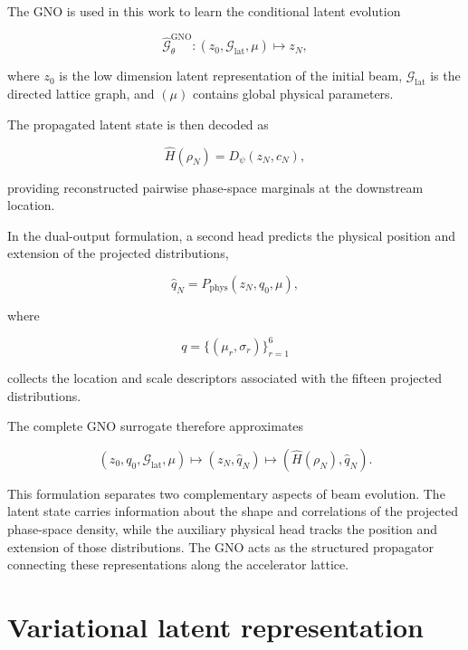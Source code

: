 The GNO is used in this work to learn the conditional latent evolution

\begin{equation}
\label{eq:133}
\widehat{\mathcal G}_{\theta}^{\mathrm{GNO}}:(z_0,\mathcal G_{\mathrm{lat}},\mu)\longmapsto z_N,
\end{equation}

where \(z_{0}\) is the low dimension latent representation of the initial beam, \(\mathcal{G}_{\mathrm{lat}}\) is the directed lattice graph, and \(( \mu )\) contains global physical parameters.

The propagated latent state is then decoded as

\begin{equation}
\label{eq:134}
\widehat H(\rho_N)=D_{\psi}(z_N,c_N),
\end{equation}

providing reconstructed pairwise phase-space marginals at the downstream location.

In the dual-output formulation, a second head predicts the physical position and extension of the projected distributions,

\begin{equation}
\label{eq:135}
\widehat q_N=P_{\mathrm{phys}}(z_N,q_0,\mu),
\end{equation}

where

\begin{equation}
\label{eq:136}
q=\{(\mu_r,\sigma_r)\}_{r=1}^{6}
\end{equation}

collects the location and scale descriptors associated with the fifteen projected distributions.

The complete GNO surrogate therefore approximates

\begin{equation}
\label{eq:137}
(z_0,q_0,\mathcal G_{\mathrm{lat}},\mu)\longmapsto(z_N,\widehat q_N)\longmapsto(\widehat H(\rho_N),\widehat q_N).
\end{equation}

This formulation separates two complementary aspects of beam evolution. The latent state carries information about the shape and correlations of the projected phase-space density, while the auxiliary physical head tracks the position and extension of those distributions. The GNO acts as the structured propagator connecting these representations along the accelerator lattice.

\section{Variational latent representation}
\label{sec:04_machine_learning_methodology_variational_latent_representation}

